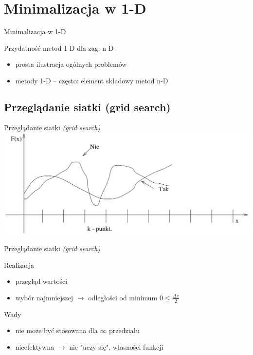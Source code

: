 \section{Minimalizacja w 1-D}
  \begin{frame}{Minimalizacja w 1-D}
    \begin{block}{Przydatność metod 1-D dla zag. n-D}
      \begin{itemize}
        \item prosta ilustracja ogólnych problemów
        \item metody 1-D -- często: element składowy metod n-D

      \end{itemize}

    \end{block}

  \end{frame}

\subsection{Przeglądanie siatki (grid search)}
  \begin{frame}{Przeglądanie siatki \emph{(grid search)}}
    \includegraphics[width=1\textwidth]{img/17/przegladanie_siatki}
  \end{frame}

  \begin{frame}{Przeglądanie siatki \emph{(grid search)}}
    \begin{block}{Realizacja}
      \begin{itemize}
        \item przegląd wartości
        \item wybór najmniejszej $ \to $ odległości od minimum
        $ 0 \leq \frac{\Delta x}{2} $
      \end{itemize}
    \end{block}
    \begin{block}{Wady}
      \begin{itemize}
        \item nie może być stosowana dla $ \infty $ przedziału
        \item nieefektywna $ \to $ nie "uczy się", własności funkcji %
      \end{itemize}
    \end{block}
  \end{frame}

